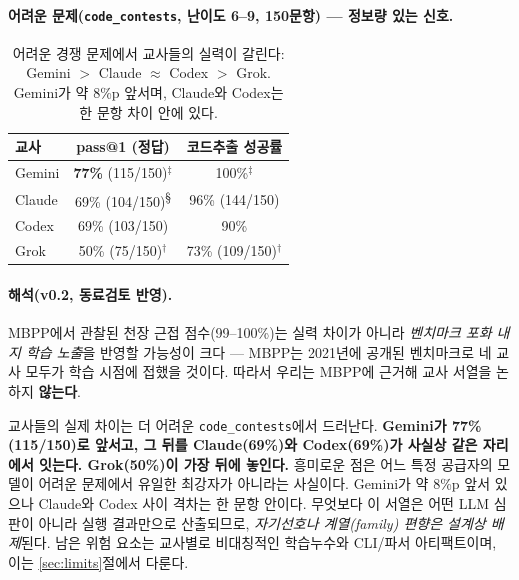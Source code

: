 \documentclass[11pt]{article}
\begin{document}
\paragraph{어려운 문제(\texttt{code\_contests}, 난이도 6--9, 150문항) --- 정보량 있는 신호.}
\begin{table}[h]\centering
\begin{tabular}{lcc}
\toprule
교사 & pass@1 (정답) & 코드추출 성공률 \\
\midrule
Gemini & \textbf{77\%} (115/150)$^{\ddagger}$ & 100\%$^{\ddagger}$ \\
Claude & 69\% (104/150)\textsuperscript{\S} & 96\% (144/150) \\
Codex  & 69\% (103/150)          & 90\% \\
Grok   & 50\% (75/150)$^{\dagger}$ & 73\% (109/150)$^{\dagger}$ \\
\bottomrule
\end{tabular}
\caption{어려운 경쟁 문제에서 교사들의 실력이 갈린다: Gemini $>$ Claude $\approx$ Codex $>$ Grok. Gemini가 약 8\%p 앞서며, Claude와 Codex는 한 문항 차이 안에 있다.}
\end{table}

\paragraph{해석(v0.2, 동료검토 반영).}
MBPP에서 관찰된 천장 근접 점수(99--100\%)는 실력 차이가 아니라 \emph{벤치마크 포화 내지 학습 노출}을 반영할 가능성이 크다 --- MBPP는 2021년에 공개된 벤치마크로 네 교사 모두가 학습 시점에 접했을 것이다. 따라서 우리는 MBPP에 근거해 교사 서열을 논하지 \textbf{않는다}.

교사들의 실제 차이는 더 어려운 \texttt{code\_contests}에서 드러난다. \textbf{Gemini가 77\%(115/150)로 앞서고, 그 뒤를 Claude(69\%)와 Codex(69\%)가 사실상 같은 자리에서 잇는다. Grok(50\%)이 가장 뒤에 놓인다.} 흥미로운 점은 어느 특정 공급자의 모델이 어려운 문제에서 유일한 최강자가 아니라는 사실이다. Gemini가 약 8\%p 앞서 있으나 Claude와 Codex 사이 격차는 한 문항 안이다. 무엇보다 이 서열은 어떤 LLM 심판이 아니라 실행 결과만으로 산출되므로, \emph{자기선호나 계열(family) 편향은 설계상 배제}된다. 남은 위험 요소는 교사별로 비대칭적인 학습누수와 CLI/파서 아티팩트이며, 이는 \ref{sec:limits}절에서 다룬다.
\end{document}
